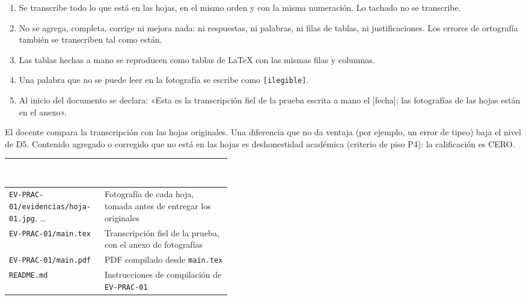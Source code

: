 \documentclass[11pt]{article}
\newcommand{\thdr}[1]{\cellcolor{utegreen}\textcolor{white}{\textbf{#1}}}
\begin{document}
	\begin{cajaaviso}[title={Reglas de la transcripción fiel}]
		\begin{enumerate}[label=\textbf{R\arabic*.},leftmargin=24pt,itemsep=2pt]
			\item Se transcribe todo lo que está en las hojas, en el mismo orden y con la misma numeración. Lo tachado no se transcribe.
			\item No se agrega, completa, corrige ni mejora nada: ni respuestas, ni palabras, ni filas de tablas, ni justificaciones. Los errores de ortografía también se transcriben tal como están.
			\item Las tablas hechas a mano se reproducen como tablas de \LaTeX{} con las mismas filas y columnas.
			\item Una palabra que no se puede leer en la fotografía se escribe como \texttt{[ilegible]}.
			\item Al inicio del documento se declara: «Esta es la transcripción fiel de la prueba escrita a mano el [fecha]; las fotografías de las hojas están en el anexo».
		\end{enumerate}
		El docente compara la transcripción con las hojas originales. Una diferencia que no da ventaja (por ejemplo, un error de tipeo) baja el nivel de D5. Contenido agregado o corregido que no está en las hojas es deshonestidad académica (criterio de piso P4): la calificación es CERO.
	\end{cajaaviso}
	
	\noindent\begin{minipage}{\linewidth}
		{\small
			\noindent\begin{tabularx}{\linewidth}{|L{0.43\linewidth}|Y|}
				\hline
				\thdr{Ruta en el repositorio} & \thdr{Contenido}\\
				\hline
				\texttt{EV-PRAC-01/\allowbreak{}evidencias/\allowbreak{}hoja-01.jpg}, \ldots & Fotografía de cada hoja, tomada antes de entregar los originales\\
				\hline
				 \texttt{EV-PRAC-01/main.tex} & Transcripción fiel de la prueba, con el anexo de fotografías\\
				\hline
				\texttt{EV-PRAC-01/main.pdf} & PDF compilado desde \texttt{main.tex}\\
				\hline
				 \texttt{README.md} & Instrucciones de compilación de \texttt{EV-PRAC-01}\\
				\hline
			\end{tabularx}
		}
	\end{minipage}
	
\end{document}
